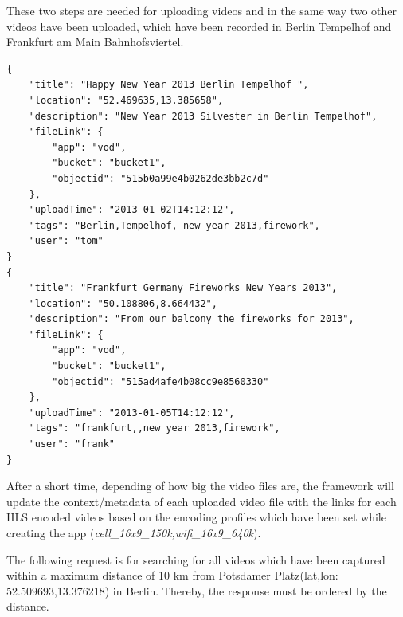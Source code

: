 These two steps are needed for uploading videos and in the same way two other videos have been uploaded, which have been recorded in Berlin Tempelhof and Frankfurt am Main Bahnhofsviertel. 
\begin{code}
\begin{verbatim}
{
	"title": "Happy New Year 2013 Berlin Tempelhof ",
	"location": "52.469635,13.385658",
	"description": "New Year 2013 Silvester in Berlin Tempelhof",
	"fileLink": {
		"app": "vod",
		"bucket": "bucket1",
		"objectid": "515b0a99e4b0262de3bb2c7d"
	},
	"uploadTime": "2013-01-02T14:12:12",
	"tags": "Berlin,Tempelhof, new year 2013,firework",
	"user": "tom"
}
{
	"title": "Frankfurt Germany Fireworks New Years 2013",
	"location": "50.108806,8.664432",
	"description": "From our balcony the fireworks for 2013",
	"fileLink": {
		"app": "vod",
		"bucket": "bucket1",
		"objectid": "515ad4afe4b08cc9e8560330"
	},
	"uploadTime": "2013-01-05T14:12:12",
	"tags": "frankfurt,,new year 2013,firework",
	"user": "frank"
}
\end{verbatim}
\end{code}

After a short time, depending of how big the video files are, the framework will update the context/metadata of each uploaded video file with the links for each \ac{HLS} encoded videos based on the encoding profiles which have been set while creating the app (\textit{cell\_16x9\_150k,wifi\_16x9\_640k}).

The following request is for searching for all videos which have been captured within a maximum distance of 10 km from Potsdamer Platz(lat,lon: 52.509693,13.376218) in Berlin. Thereby, the response must be ordered by the distance.

